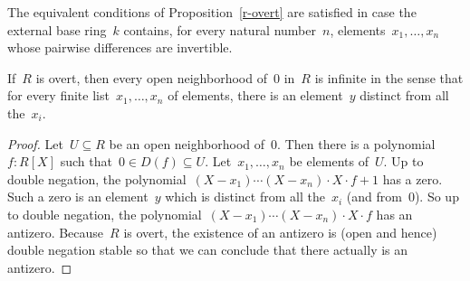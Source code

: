 \begin{remark}The equivalent conditions of Proposition~\ref{r-overt} are
satisfied in case the external base ring~$k$ contains, for every natural
number~$n$, elements~$x_1,\ldots,x_n$ whose pairwise differences are
invertible.\end{remark}

\begin{proposition}If~$R$ is overt, then every open neighborhood of~$0$ in~$R$
is infinite in the sense that for every finite list~$x_1,\ldots,x_n$ of
elements, there is an element~$y$ distinct from all the~$x_i$.
\end{proposition}

\begin{proof}Let~$U \subseteq R$ be an open neighborhood of~$0$. Then there is
a polynomial~$f : R[X]$ such that~$0 \in D(f) \subseteq U$.
Let~$x_1,\ldots,x_n$ be elements of~$U$. Up to double
negation, the polynomial~$(X-x_1)\cdots(X-x_n) \cdot X \cdot f + 1$ has a zero. Such a zero is an
element~$y$ which is distinct from all the~$x_i$ (and from~$0$). So up to
double negation, the polynomial~$(X-x_1)\cdots(X-x_n) \cdot X \cdot f$ has an
antizero. Because~$R$ is overt, the existence of an antizero is (open and
hence) double negation stable so that we can conclude that there actually is an
antizero.
\end{proof}
